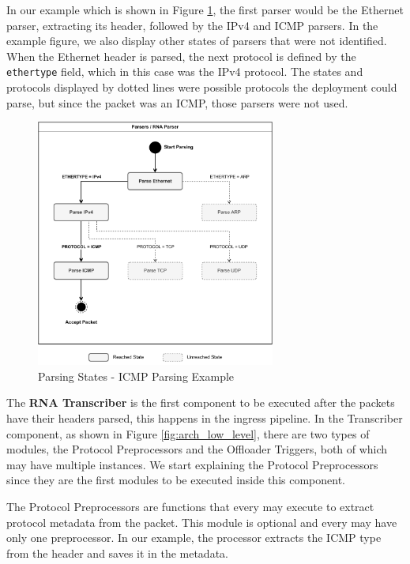 In our example which is shown in Figure \ref{fig:icmp_ex_parser}, the first parser would be the Ethernet parser, extracting its header, followed by the IPv4 and ICMP parsers. In the example figure, we also display other states of parsers that were not identified. When the Ethernet header is parsed, the next protocol is defined by the \texttt{ethertype} field, which in this case was the IPv4 protocol. The states and protocols displayed by dotted lines were possible protocols the deployment could parse, but since the packet was an ICMP, those parsers were not used.

\begin{figure}[ht]
    \caption{Parsing States - ICMP Parsing Example}
    \begin{center}
        \includegraphics[width=0.7\textwidth]{images/icmp_ex_parser.pdf}  
    \end{center}
    \label{fig:icmp_ex_parser}
\end{figure}



The \textbf{RNA Transcriber} is the first component to be executed after the packets have their headers parsed, this happens in the ingress pipeline. In the Transcriber component, as shown in Figure \ref{fig:arch_low_level}, there are two types of modules, the Protocol Preprocessors and the Offloader Triggers, both of which may have multiple instances. We start explaining the Protocol Preprocessors since they are the first modules to be executed inside this component.

The Protocol Preprocessors are functions that every \ProtocolTemplate{} may execute to extract protocol metadata from the packet. This module is optional and every \ProtocolTemplate{} may have only one preprocessor. In our example, the processor extracts the ICMP type from the header and saves it in the metadata.

